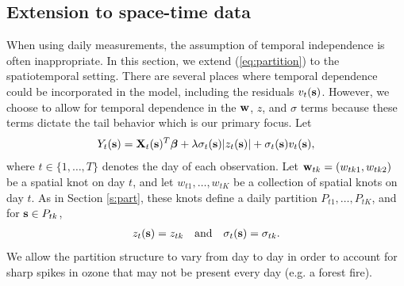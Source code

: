 \documentclass[11pt]{article}
\begin{document}
\subsection{Extension to space-time data} \label{s:temporal}
When using daily measurements, the assumption of temporal independence is often inappropriate.
In this section, we extend (\ref{eq:partition}) to the spatiotemporal setting.
There are several places where temporal dependence could be incorporated in the model, including the residuals $v_t(\mbox{\bf s})$.
However, we choose to allow for temporal dependence in the $\mbox{\bf w}$, $z$, and $\sigma$ terms because these terms dictate the tail behavior which is our primary focus.
Let
\begin{align} \label{eq:spatiotemp}
  Y_t(\mbox{\bf s}) = \mbox{\bf X}_t(\mbox{\bf s})^T \mbox{\boldmath $\beta$} + \lambda \sigma_t(\mbox{\bf s}) |z_t(\mbox{\bf s})| + \sigma_t(\mbox{\bf s}) v_t(\mbox{\bf s}),
\end{align}
where $t \in \{1, \ldots, T\}$ denotes the day of each observation.
Let \hbox{$\mbox{\bf w}_{tk} = (w_{tk1}, w_{tk2})$} be a spatial knot on day $t$, and let $w_{t1}, \ldots, w_{tK}$ be a collection of spatial knots on day $t$.
As in Section \ref{s:part}, these knots define a daily partition $P_{t1}, \ldots, P_{tK}$, and for $\mbox{\bf s} \in P_{tk}$,
\begin{align}
  z_t(\mbox{\bf s}) = z_{tk}\quad \text{and} \quad \sigma_{t}(\mbox{\bf s}) = \sigma_{tk}.
\end{align}
We allow the partition structure to vary from day to day in order to account for sharp spikes in ozone that may not be present every day (e.g. a forest fire).
\end{document}
